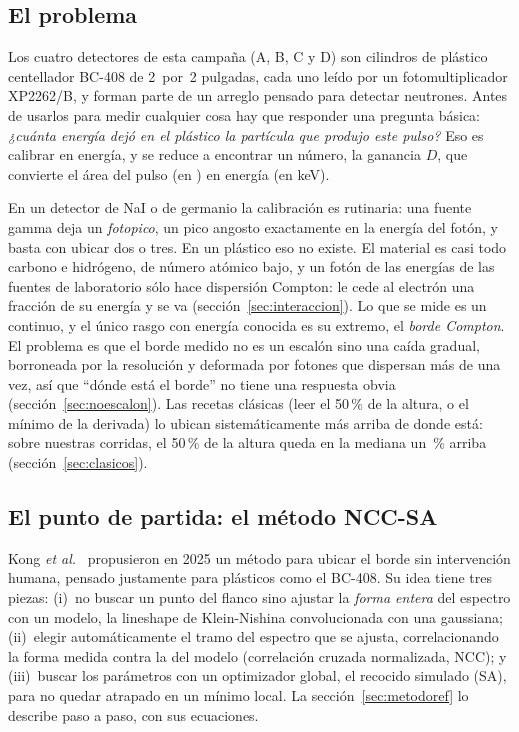 \documentclass[11pt,a4paper]{article}
\begin{document}
\subsection{El problema}

Los cuatro detectores de esta campaña (A, B, C y D) son cilindros de plástico
centellador BC-408 de 2~por~2 pulgadas, cada uno leído por un
fotomultiplicador XP2262/B, y forman parte de un arreglo pensado para
detectar neutrones. Antes de usarlos para medir cualquier cosa hay que
responder una pregunta básica: \emph{¿cuánta energía dejó en el plástico la
partícula que produjo este pulso?} Eso es calibrar en energía, y se reduce a
encontrar un número, la ganancia $D$, que convierte el área del pulso
(en \mVns) en energía (en keV).

En un detector de NaI o de germanio la calibración es rutinaria: una fuente
gamma deja un \emph{fotopico}, un pico angosto exactamente en la energía del
fotón, y basta con ubicar dos o tres. En un plástico eso no existe. El
material es casi todo carbono e hidrógeno, de número atómico bajo, y un fotón
de las energías de las fuentes de laboratorio sólo hace dispersión Compton:
le cede al electrón una fracción de su energía y se va
(sección~\ref{sec:interaccion}). Lo que se mide es un continuo, y el único
rasgo con energía conocida es su extremo, el \emph{borde Compton}. El
problema es que el borde medido no es un escalón sino una caída gradual,
borroneada por la resolución y deformada por fotones que dispersan más de una
vez, así que ``dónde está el borde'' no tiene una respuesta obvia
(sección~\ref{sec:noescalon}). Las recetas clásicas (leer el 50\,\% de la
altura, o el mínimo de la derivada) lo ubican sistemáticamente más arriba de donde está: sobre nuestras
corridas, el 50\,\% de la altura queda en la mediana un \ClasRealMitadMed\,\%
arriba (sección~\ref{sec:clasicos}).

\subsection{El punto de partida: el método NCC-SA}

Kong \emph{et al.}~\cite{kong2025} propusieron en 2025 un método para ubicar
el borde sin intervención humana, pensado justamente para plásticos como el
BC-408. Su idea tiene tres piezas: (i)~no buscar un punto del flanco sino
ajustar la \emph{forma entera} del espectro con un modelo, la lineshape de
Klein-Nishina convolucionada con una gaussiana; (ii)~elegir automáticamente
el tramo del espectro que se ajusta, correlacionando la forma medida contra
la del modelo (correlación cruzada normalizada, NCC); y (iii)~buscar los
parámetros con un optimizador global, el recocido simulado (SA), para no
quedar atrapado en un mínimo local. La sección~\ref{sec:metodoref} lo
describe paso a paso, con sus ecuaciones.
\end{document}
